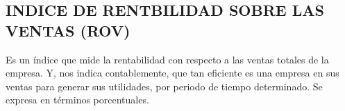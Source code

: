 \documentclass[
  letterpaper,
  DIV=11,
  numbers=noendperiod]{scrartcl}
\begin{document}
\hypertarget{indice-de-rentbilidad-sobre-las-ventas-rov}{%
\subsection{INDICE DE RENTBILIDAD SOBRE LAS VENTAS
(ROV)}\label{indice-de-rentbilidad-sobre-las-ventas-rov}}

Es un índice que mide la rentabilidad con respecto a las ventas totales
de la empresa. Y, nos indica contablemente, que tan eficiente es una
empresa en sus ventas para generar sus utilidades, por periodo de tiempo
determinado. Se expresa en términos porcentuales.


\printbibliography
\end{document}

